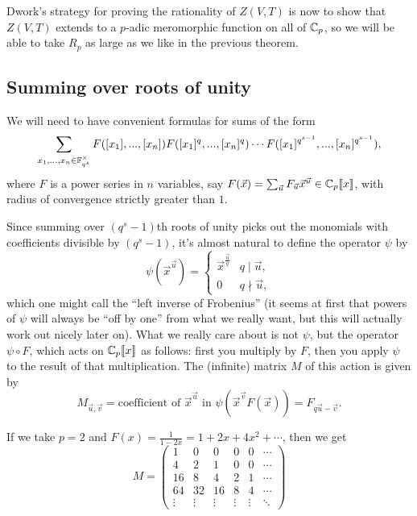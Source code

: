 \documentclass[letterpaper,11pt]{article}
\begin{document}
Dwork's strategy for proving the rationality of $Z(V,T)$ is now to show that $Z(V,T)$ extends to a $p$-adic meromorphic function on all of $\mathbb{C}_p$, so we will be able to take $R_p$ as large as we like in the previous theorem.

\subsection{Summing over roots of unity}

We will need to have convenient formulas for sums of the form
\[
\sum_{x_1, ..., x_n \in \mathbb{F}_{q^s}^{\times}} F([x_1], ..., [x_n])F([x_1]^q, ..., [x_n]^q) \cdots F([x_1]^{q^{s-1}}, ..., [x_n]^{q^{s-1}}),
\]
where $F$ is a power series in $n$ variables, say $F(\vec{x}) = \sum_{\vec{u}} F_{\vec{u}} \vec{x}^{\vec{u}} \in \mathbb{C}_p[\![x]\!]$, with radius of convergence strictly greater than $1$.

Since summing over $(q^s-1)$th roots of unity picks out the monomials with coefficients divisible by $(q^s-1)$, it's almost natural to define the operator $\psi$ by
\[
\psi(\vec{x}^{\vec{u}}) = \begin{cases} \vec{x}^{\frac{\vec{u}}{q}} & q \mid \vec{u},\\ 0 & q \nmid \vec{u},\end{cases}
\]
which one might call the ``left inverse of Frobenius'' (it seems at first that powers of $\psi$ will always be ``off by one'' from what we really want, but this will actually work out nicely later on). What we really care about is not $\psi$, but the operator $\psi \circ F$, which acts on $\mathbb{C}_p[\![x]\!]$ as follows: first you multiply by $F$, then you apply $\psi$ to the result of that multiplication. The (infinite) matrix $M$ of this action is given by
\[
M_{\vec{u},\vec{v}} = \text{coefficient of } \vec{x}^{\vec{u}} \text{ in } \psi(\vec{x}^{\vec{v}}F(\vec{x})) = F_{q\vec{u}-\vec{v}}.
\]

\begin{ex} If we take $p=2$ and $F(x) = \frac{1}{1-2x} = 1 + 2x + 4x^2 + \cdots$, then we get
\[
M = \begin{pmatrix}1 & 0 & 0 & 0 & 0 & \cdots\\ 4 & 2 & 1 & 0 & 0 & \cdots\\ 16 & 8 & 4 & 2 & 1 & \cdots \\ 64 & 32 & 16 & 8 & 4 & \cdots\\ \vdots & \vdots & \vdots & \vdots & \vdots & \ddots \end{pmatrix}
\]
\end{ex}
\end{document}
